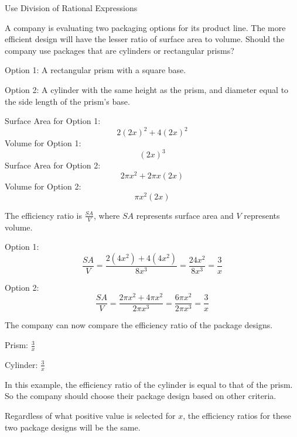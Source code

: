 \documentclass{article}
\newenvironment{concept-box}{}{}        %
\newenvironment{example}[1]{}{}         %
\newcommand{\answer}[1]{}               %
\newcommand{\placeholder}[2]{}          %
\begin{document}
\begin{example}{6}
Use Division of Rational Expressions

\placeholder{illustration}{Two package designs: a rectangular box and a cylindrical package.}

A company is evaluating two packaging options for its product line. The more efficient design will have the lesser ratio of surface area to volume. Should the company use packages that are cylinders or rectangular prisms?

Option 1: A rectangular prism with a square base.

Option 2: A cylinder with the same height as the prism, and diameter equal to the side length of the prism's base.


Surface Area for Option 1:
\[
2(2x)^2+4(2x)^2
\]
Volume for Option 1:
\[
(2x)^3
\]
Surface Area for Option 2:
\[
2\pi x^2+2\pi x(2x)
\]
Volume for Option 2:
\[
\pi x^2(2x)
\]

The efficiency ratio is $\frac{SA}{V}$, where $SA$ represents surface area and $V$ represents volume.

Option 1:
\[
\frac{SA}{V}
=
\frac{2(4x^2)+4(4x^2)}{8x^3}
=
\frac{24x^2}{8x^3}
=
\frac3x
\]

Option 2:
\[
\frac{SA}{V}
=
\frac{2\pi x^2+4\pi x^2}{2\pi x^3}
=
\frac{6\pi x^2}{2\pi x^3}
=
\frac3x
\]

The company can now compare the efficiency ratio of the package designs.

Prism: $\frac3x$

Cylinder: $\frac3x$

In this example, the efficiency ratio of the cylinder is equal to that of the prism. So the company should choose their package design based on other criteria.

\begin{concept-box}
Regardless of what positive value is selected for $x$, the efficiency ratios for these two package designs will be the same.
\end{concept-box}

\answer{The prism and cylinder both have efficiency ratio $\frac3x$; the company should choose the package design based on other criteria.}
\end{example}
\end{document}
